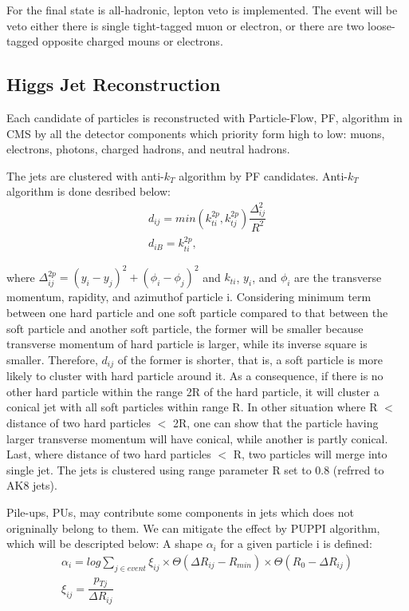 For the final state is all-hadronic, lepton veto is implemented. The event will be veto either there is single tight-tagged muon or electron, or there are two loose-tagged opposite charged mouns or electrons.

\subsection{Higgs Jet Reconstruction} 
Each candidate of particles is reconstructed with Particle-Flow, PF, algorithm in CMS by all the detector components which priority form high to low: muons, electrons, photons, charged hadrons, and neutral hadrons.

The jets are clustered with anti-$k_{T}$ algorithm by PF candidates. Anti-$k_{T}$ algorithm is done desribed below: 
\begin{equation} \label{eq1}
\begin{split}
d_{ij} = min(k^{2p}_{ti},k^{2p}_{tj})\dfrac{\Delta ^2_{ij}}{R^2}\\
d_{iB} = k^{2p}_{ti} ,	
\end{split}
\end{equation}

where $\Delta ^{2p}_{ij}= (y_{i}-y_{j})^2+(\phi_{i}-\phi_{j})^2$ and $k_{ti}$, $y_{i}$, and $\phi _{i}$ are the transverse momentum, rapidity, and azimuthof particle i.
Considering minimum term between one hard particle and one soft particle compared to that between the soft particle and another soft particle, the former will be smaller because transverse momentum of hard particle is larger, while its inverse square is smaller. 
Therefore, $d_{ij}$ of the former is shorter, that is, a soft particle is more likely to cluster with hard particle around it. 
As a consequence, if there is no other hard particle within the range 2R of the hard particle, it will cluster a conical jet with all soft particles within range R. 
In other situation where R $<$ distance of two hard particles $<$ 2R, one can show that the particle having larger transverse momentum will have conical, while another is partly conical.
Last, where distance of two hard particles $<$ R, two particles will merge into single jet. The jets is clustered using range parameter R set to 0.8 (refrred to AK8 jets).

Pile-ups, PUs, may contribute some components in jets which does not origninally belong to them. We can mitigate the effect by PUPPI algorithm, which will be descripted below:
 A shape $\alpha _{i}$ for a given particle i is defined: 
\begin{equation} \label{eq2}
\begin{split}
\alpha_i = log \sum\limits_{j\in event} \xi _{ij} \times \Theta(\Delta R_{ij} - R_{min}) \times \Theta(R_0 - \Delta R_{ij}) \\
\xi _{ij} = \dfrac{p_{Tj}}{\Delta R_{ij}}
\end{split}
\end{equation}

